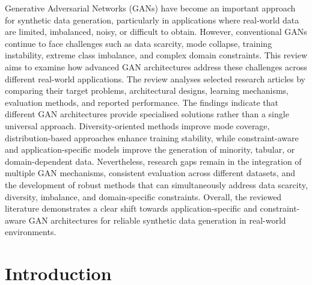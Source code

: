 \documentclass[12pt,a4paper]{article}
\begin{document}
\begin{justify}
Generative Adversarial Networks (GANs) have become an important approach for
synthetic data generation, particularly in applications where real-world data
are limited, imbalanced, noisy, or difficult to obtain. However, conventional
GANs continue to face challenges such as data scarcity, mode collapse, training
instability, extreme class imbalance, and complex domain constraints. This
review aims to examine how advanced GAN architectures address these
challenges across different real-world applications. The review analyses
selected research articles by comparing their target problems, architectural
designs, learning mechanisms, evaluation methods, and reported performance.
The findings indicate that different GAN architectures provide specialised
solutions rather than a single universal approach. Diversity-oriented methods
improve mode coverage, distribution-based approaches enhance training
stability, while constraint-aware and application-specific models improve the
generation of minority, tabular, or domain-dependent data. Nevertheless,
research gaps remain in the integration of multiple GAN mechanisms, consistent
evaluation across different datasets, and the development of robust methods
that can simultaneously address data scarcity, diversity, imbalance, and
domain-specific constraints. Overall, the reviewed literature demonstrates a
clear shift towards application-specific and constraint-aware GAN architectures
for reliable synthetic data generation in real-world environments.

\vspace{1em}

\end{justify}





\newpage

\tableofcontents

\newpage





\section{Introduction}
\end{document}

